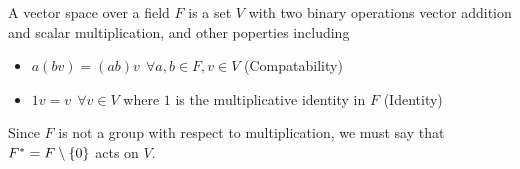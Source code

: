 \begin{example}
    A vector space over a field $F$ is a set $V$ with two binary operations vector addition and scalar multiplication, and other poperties including 
    \begin{itemize}
        \item $a(bv) = (ab)v ~~\forall a, b \in F, v \in V$ (Compatability)
        \item $1v = v ~~\forall v \in V$ where $1$ is the multiplicative identity in $F$ (Identity)
    \end{itemize}
    Since $F$ is not a group with respect to multiplication, we must say that $F^\ast = F \setminus \left\{0\right\}$ acts on $V$.
\end{example}